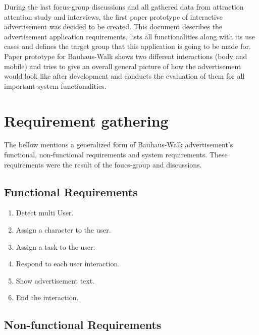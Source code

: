 During the last focus-group discussions and all gathered data from attraction attention study and interviews, the first paper prototype of interactive advertisement was decided to be created. This document describes the advertisement application requirements, lists all functionalities along with its use cases and defines the target group that this application is going to be made for. Paper prototype for Bauhaus-Walk \cite{BauhausWalk} shows two different interactions (body and mobile) and tries to give an overall general picture of how the advertisement would look like after development and conducts the evaluation of them for all important system functionalities.


\newpage
\section{Requirement gathering}
The bellow mentions a generalized form of Bauhaus-Walk advertisement's functional, non-functional requirements and system requirements. These requirements were the result of the foucs-group and discussions.

\subsection{Functional Requirements}

\begin{enumerate}
\item	Detect multi User.
\item	Assign a character to the user. 
\item	Assign a task to the user.
\item	Respond to each user interaction.
\item	Show advertisement text.
\item	End the interaction.
\end{enumerate}


\subsection{Non-functional Requirements}

